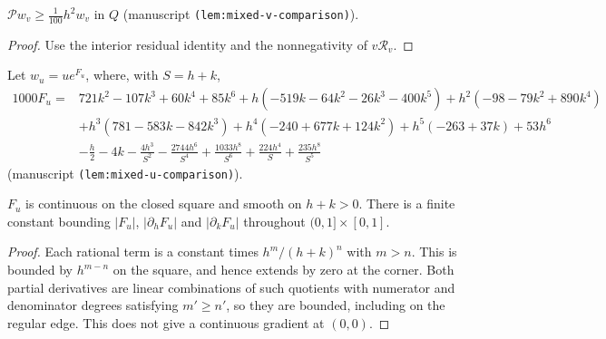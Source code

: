 \begin{lemma}
\label{lem:mixed-v-comparison}
\leanok
$\mathcal Pw_v\ge\tfrac1{100}h^2w_v$ in $Q$
(manuscript \texttt{(lem:mixed-v-comparison)}).
\end{lemma}

\begin{proof}
\leanok
Use the interior residual identity and the nonnegativity of $v\mathcal R_v$.
\end{proof}

\begin{definition}
\label{def:odd-a-comparison}
\leanok
Let $w_u=ue^{F_u}$, where, with $S=h+k$,
\begin{align*}
1000F_u={}&721k^2-107k^3+60k^4+85k^6
 +h(-519k-64k^2-26k^3-400k^5)+h^2(-98-79k^2+890k^4)\\
 &+h^3(781-583k-842k^3)+h^4(-240+677k+124k^2)+h^5(-263+37k)+53h^6\\
 &-\frac h2-4k-\frac{4h^3}{S^2}-\frac{2744h^6}{S^4}+\frac{1033h^8}{S^6}
  +\frac{224h^4}{S}+\frac{235h^8}{S^5}
\end{align*}
(manuscript \texttt{(lem:mixed-u-comparison)}).
\end{definition}

\begin{lemma}
\label{lem:mixed-u-exponent-bounds}
\leanok
$F_u$ is continuous on the closed square and smooth on $h+k>0$.
There is a finite constant bounding $|F_u|$, $|\partial_hF_u|$ and
$|\partial_kF_u|$ throughout $(0,1]\times[0,1]$.
\end{lemma}

\begin{proof}
\leanok
Each rational term is a constant times $h^m/(h+k)^n$ with $m>n$.
This is bounded by $h^{m-n}$ on the square, and hence extends by zero at
the corner. Both partial derivatives are linear combinations of such
quotients with numerator and denominator degrees satisfying $m'\ge n'$,
so they are bounded, including on the regular edge. This does not give a
continuous gradient at $(0,0)$.
\end{proof}

